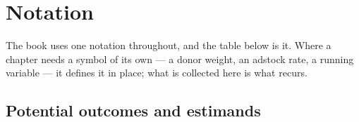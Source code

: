 %
%
\chapter*{Notation}

The book uses one notation throughout, and the table below is it. Where a chapter needs a symbol of
its own --- a donor weight, an adstock rate, a running variable --- it defines it in place; what is
collected here is what recurs.

\section*{Potential outcomes and estimands}

